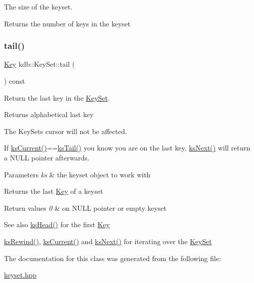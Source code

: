 The size of the keyset. 

\begin{DoxyReturn}{Returns}
the number of keys in the keyset 
\end{DoxyReturn}
\mbox{\label{classkdb_1_1KeySet_a16deed50e0d8cfee023d4423a119df51}} 
\subsubsection{\texorpdfstring{tail()}{tail()}}
{\footnotesize\ttfamily \mbox{\hyperlink{classkdb_1_1Key}{Key}} kdb\+::\+Key\+Set\+::tail (\begin{DoxyParamCaption}{ }\end{DoxyParamCaption}) const\hspace{0.3cm}{\ttfamily [inline]}}



Return the last key in the \mbox{\hyperlink{classkdb_1_1KeySet}{Key\+Set}}. 

\begin{DoxyReturn}{Returns}
alphabetical last key
\end{DoxyReturn}
The Key\+Sets cursor will not be affected.

If \mbox{\hyperlink{group__keyset_ga4287b9416912c5f2ab9c195cb74fb094}{ks\+Current()}}==\mbox{\hyperlink{group__keyset_gadca442c4ab43cf532b15091d7711559e}{ks\+Tail()}} you know you are on the last key. \mbox{\hyperlink{group__keyset_ga317321c9065b5a4b3e33fe1c399bcec9}{ks\+Next()}} will return a N\+U\+LL pointer afterwards.


\begin{DoxyParams}{Parameters}
{\em ks} & the keyset object to work with \\
\hline
\end{DoxyParams}
\begin{DoxyReturn}{Returns}
the last \mbox{\hyperlink{classkdb_1_1Key}{Key}} of a keyset 
\end{DoxyReturn}

\begin{DoxyRetVals}{Return values}
{\em 0} & on N\+U\+LL pointer or empty keyset \\
\hline
\end{DoxyRetVals}
\begin{DoxySeeAlso}{See also}
\mbox{\hyperlink{group__keyset_gae7dbf3aef70e67b5328475eb3d1f92f5}{ks\+Head()}} for the first \mbox{\hyperlink{group__key}{Key}} 

\mbox{\hyperlink{group__keyset_gabe793ff51f1728e3429c84a8a9086b70}{ks\+Rewind()}}, \mbox{\hyperlink{group__keyset_ga4287b9416912c5f2ab9c195cb74fb094}{ks\+Current()}} and \mbox{\hyperlink{group__keyset_ga317321c9065b5a4b3e33fe1c399bcec9}{ks\+Next()}} for iterating over the \mbox{\hyperlink{group__keyset}{Key\+Set}} 
\end{DoxySeeAlso}


The documentation for this class was generated from the following file\+:\begin{DoxyCompactItemize}
\item 
\mbox{\hyperlink{keyset_8hpp}{keyset.\+hpp}}\end{DoxyCompactItemize}
